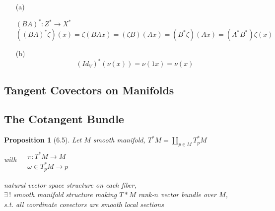 \documentclass[twoside]{amsart}
\theoremstyle{plain}
\newtheorem{proposition}{Proposition}
\theoremstyle{definition}
\begin{document}
\begin{enumerate}
\item[(a)] 



$(BA)^* : Z^* \to X^*$
\[
((BA)^* \zeta)(x) = \zeta(BAx) = (\zeta B)(Ax) = (B^* \zeta)(Ax) = (A^* B^*)\zeta(x)
\]

\item[(b)]
\[
(Id_V)^*(\nu(x)) = \nu(1x) = \nu(x)
\]
\end{enumerate}

\subsection*{ Tangent Covectors on Manifolds}



\subsection*{ The Cotangent Bundle}

\begin{proposition}[6.5] Let $M$ smooth manifold, $T^*M = \coprod_{p \in M} T_p^*M$ \\
with $\begin{aligned} & \quad \\ 
  & \pi : T^*M \to M \\ 
  & \omega \in T^*_pM \to p \end{aligned}$

natural vector space structure on each fiber, \\
$\exists \, !$ smooth manifold structure making $T*M$ rank-$n$ vector bundle over $M$, \\
s.t. all coordinate covectors are smooth local sections
\end{proposition}
\end{document}
